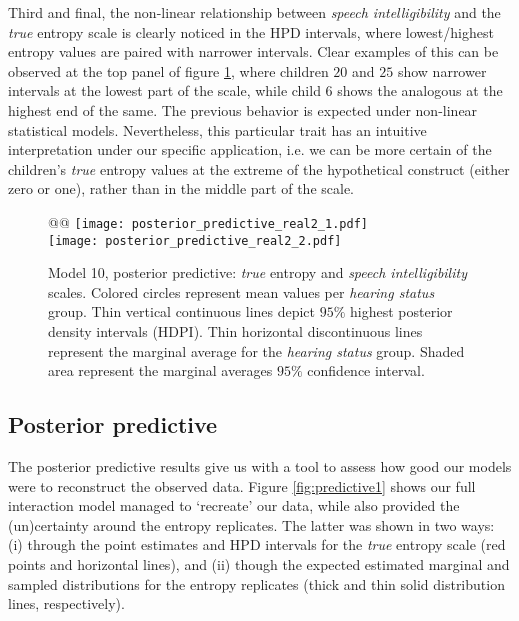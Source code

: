 Third and final, the non-linear relationship between \textit{speech intelligibility} and the \textit{true} entropy scale is clearly noticed in the HPD intervals, where lowest/highest entropy values are paired with narrower intervals. Clear examples of this can be observed at the top panel of figure \ref{fig:predictive2}, where children $20$ and $25$ show narrower intervals at the lowest part of the scale, while child $6$ shows the analogous at the highest end of the same. The previous behavior is expected under non-linear statistical models. Nevertheless, this particular trait has an intuitive interpretation under our specific application, i.e. we can be more certain of the children's \textit{true} entropy values at the extreme of the hypothetical construct (either zero or one), rather than in the middle part of the scale.
%
%
\begin{figure}[!h]
	\centering
	\begin{tabular}{@{}@{}}
		\texttt{[image: posterior\_predictive\_real2\_1.pdf]} \\
		\texttt{[image: posterior\_predictive\_real2\_2.pdf]}
	\end{tabular}
	\caption[Model 10, posterior predictive: \textit{true} entropy and \textit{speech intelligibility} scales]{Model 10, posterior predictive: \textit{true} entropy and \textit{speech intelligibility} scales. Colored circles represent mean values per \textit{hearing status} group. Thin vertical continuous lines depict $95\%$ highest posterior density intervals (HDPI). Thin horizontal discontinuous lines represent the marginal average for the \textit{hearing status} group. Shaded area represent the marginal averages $95\%$ confidence interval.}
	\label{fig:predictive2}
\end{figure}
%
%
\subsection{Posterior predictive} \label{sS:results_posterior}
%
The posterior predictive results give us with a tool to assess how good our models were to reconstruct the observed data. Figure \ref{fig:predictive1} shows our full interaction model managed to `recreate' our data, while also provided the (un)certainty around the entropy replicates. The latter was shown in two ways: (i) through the point estimates and HPD intervals for the \textit{true} entropy scale (red points and horizontal lines), and (ii) though the expected estimated marginal and sampled distributions for the entropy replicates (thick and thin solid distribution lines, respectively).
%
%
